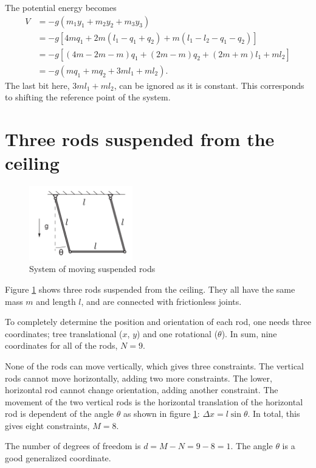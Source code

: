 \documentclass[11pt]{amsart}
\begin{document}
The potential energy becomes
\begin{align*}
V 	&= -g( m_1y_1 + m_2y_2 + m_3y_3 ) \\
	&= -g[ 4mq_1 + 2m(l_1 - q_1 + q_2) + m(l_1 - l_2 - q_1 - q_2)] \\
	&= -g[ (4m - 2m - m)q_1 + (2m - m)q_2 + (2m + m)l_1 + ml_2 ] \\ 
	&= -g( mq_1 + mq_2 + 3ml_1 + ml_2 ).
\end{align*}
The last bit here, $3ml_1 + ml_2$, can be ignored as it is constant. This corresponds to shifting the reference point of the system.

\section{Three rods suspended from the ceiling}

\begin{figure}
	\centering
	\includegraphics[width = 0.4\textwidth]{./figures/problem3.png}
	\caption{System of moving suspended rods}
	\label{fig:rods}
\end{figure}

Figure \ref{fig:rods} shows three rods suspended from the ceiling. They all have the same mass $m$ and length $l$, and are connected with frictionless joints.

To completely determine the position and orientation of each rod, one needs three coordinates; tree translational ($x$, $y$) and one rotational ($\theta$). In sum, nine coordinates for all of the rods, $N=9$.

None of the rods can move vertically, which gives three constraints. The vertical rods cannot move horizontally, adding two more constraints. The lower, horizontal rod cannot change orientation, adding another constraint. The movement of the two vertical rods is the horizontal translation of the horizontal rod is dependent of the angle $\theta$ as shown in figure \ref{fig:rods}: $\Delta x = l\sin \theta$. In total, this gives eight constraints, $M=8$.

The number of degrees of freedom is $d = M - N = 9 - 8 = 1$. The angle $\theta$ is a good generalized coordinate.
\end{document}

